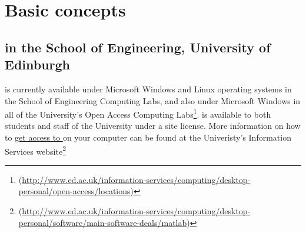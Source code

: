 \chapter{Basic concepts} \label{ch:intro}

\section{\mlab in the School of Engineering, University of Edinburgh}
\mlab is currently available under Microsoft Windows and Linux operating systems in the School of Engineering Computing Labs, and also under Microsoft Windows in all of the University's Open Access Computing Labs\footnote{(\href{http://www.ed.ac.uk/information-services/computing/desktop-personal/open-access/locations}{http://www.ed.ac.uk/information-services/computing/desktop-personal/open-access/locations})}. \mlab is available to both students and staff of the University under a site license. More information on how to \href{http://www.ed.ac.uk/information-services/computing/desktop-personal/software/main-software-deals/matlab}{get access to \mlab} on your computer can be found at the Univeristy's Information Services website\footnote{(\href{http://www.ed.ac.uk/information-services/computing/desktop-personal/software/main-software-deals/matlab}{http://www.ed.ac.uk/information-services/computing/desktop-personal/software/main-software-deals/matlab})}

